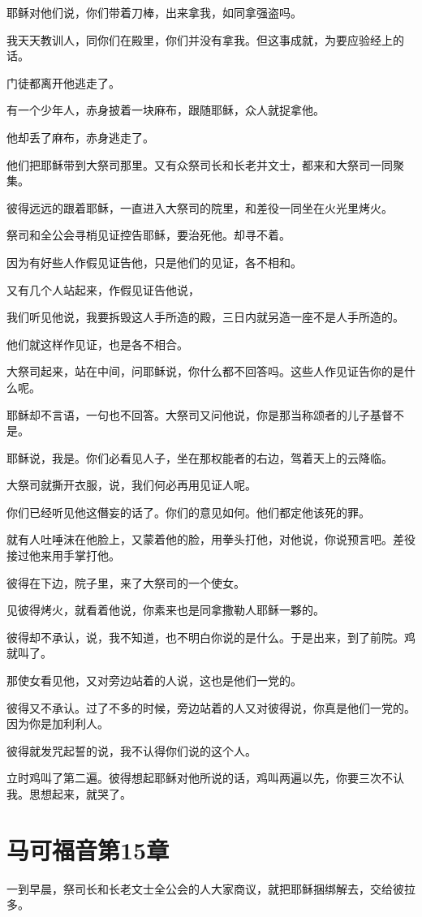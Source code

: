 \documentclass[12pt,oneside]{book}
\begin{document}
耶稣对他们说，你们带着刀棒，出来拿我，如同拿强盗吗。

我天天教训人，同你们在殿里，你们并没有拿我。但这事成就，为要应验经上的话。

门徒都离开他逃走了。

有一个少年人，赤身披着一块麻布，跟随耶稣，众人就捉拿他。

他却丢了麻布，赤身逃走了。

他们把耶稣带到大祭司那里。又有众祭司长和长老并文士，都来和大祭司一同聚集。

彼得远远的跟着耶稣，一直进入大祭司的院里，和差役一同坐在火光里烤火。

祭司和全公会寻梢见证控告耶稣，要治死他。却寻不着。

因为有好些人作假见证告他，只是他们的见证，各不相和。

又有几个人站起来，作假见证告他说，

我们听见他说，我要拆毁这人手所造的殿，三日内就另造一座不是人手所造的。

他们就这样作见证，也是各不相合。

大祭司起来，站在中间，问耶稣说，你什么都不回答吗。这些人作见证告你的是什么呢。

耶稣却不言语，一句也不回答。大祭司又问他说，你是那当称颂者的儿子基督不是。

耶稣说，我是。你们必看见人子，坐在那权能者的右边，驾着天上的云降临。

大祭司就撕开衣服，说，我们何必再用见证人呢。

你们已经听见他这僭妄的话了。你们的意见如何。他们都定他该死的罪。

就有人吐唾沫在他脸上，又蒙着他的脸，用拳头打他，对他说，你说预言吧。差役接过他来用手掌打他。

彼得在下边，院子里，来了大祭司的一个使女。

见彼得烤火，就看着他说，你素来也是同拿撒勒人耶稣一夥的。

彼得却不承认，说，我不知道，也不明白你说的是什么。于是出来，到了前院。鸡就叫了。

那使女看见他，又对旁边站着的人说，这也是他们一党的。

彼得又不承认。过了不多的时候，旁边站着的人又对彼得说，你真是他们一党的。因为你是加利利人。

彼得就发咒起誓的说，我不认得你们说的这个人。

立时鸡叫了第二遍。彼得想起耶稣对他所说的话，鸡叫两遍以先，你要三次不认我。思想起来，就哭了。

\chapter{马可福音第15章}
一到早晨，祭司长和长老文士全公会的人大家商议，就把耶稣捆绑解去，交给彼拉多。
\end{document}
